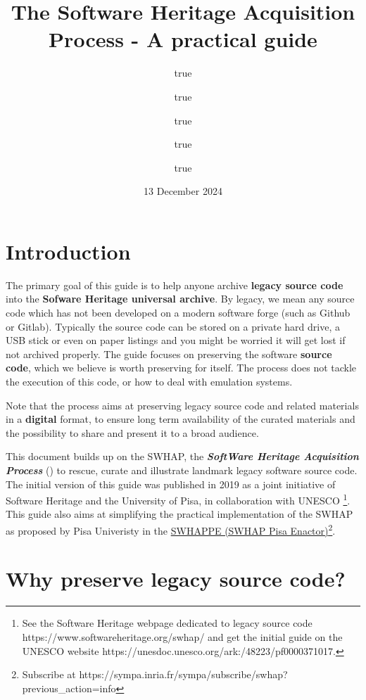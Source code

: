 \documentclass[]{article}
\title{The Software Heritage Acquisition Process - A practical guide}
\author{true \and true \and true \and true \and true}
\date{13 December 2024}
\begin{document}
\maketitle

{
\setcounter{tocdepth}{2}
\tableofcontents
}
\hypertarget{introduction}{%
\section{Introduction}\label{introduction}}

The primary goal of this guide is to help anyone archive \textbf{legacy
source code} into the \textbf{Sofware Heritage universal archive}. By
legacy, we mean any source code which has not been developed on a modern
software forge (such as Github or Gitlab). Typically the source code can
be stored on a private hard drive, a USB stick or even on paper listings
and you might be worried it will get lost if not archived properly. The
guide focuses on preserving the software \textbf{source code}, which we
believe is worth preserving for itself. The process does not tackle the
execution of this code, or how to deal with emulation systems.

Note that the process aims at preserving legacy source code and related
materials in a \textbf{digital} format, to ensure long term availability
of the curated materials and the possibility to share and present it to
a broad audience.

This document builds up on the SWHAP, the \textbf{\emph{SoftWare
Heritage Acquisition Process}} (\textcite{swhcacm2018}) to rescue,
curate and illustrate landmark legacy software source code. The initial
version of this guide was published in 2019 as a joint initiative of
Software Heritage and the University of Pisa, in collaboration with
UNESCO \footnote{See the Software Heritage webpage dedicated to legacy
  source code https://www.softwareheritage.org/swhap/ and get the
  initial guide on the UNESCO website
  https://unesdoc.unesco.org/ark:/48223/pf0000371017.}. This guide also
aims at simplifying the practical implementation of the SWHAP as
proposed by Pisa Univeristy in the
\href{https://github.com/SoftwareHeritage/swhapguide/blob/master/SWHAP\%40Pisa.pdf}{SWHAPPE
(SWHAP Pisa Enactor)}\footnote{Subscribe at
  https://sympa.inria.fr/sympa/subscribe/swhap?previous\_action=info}.

\hypertarget{sec:whypreserve}{%
\section{Why preserve legacy source code?}\label{sec:whypreserve}}
\end{document}
